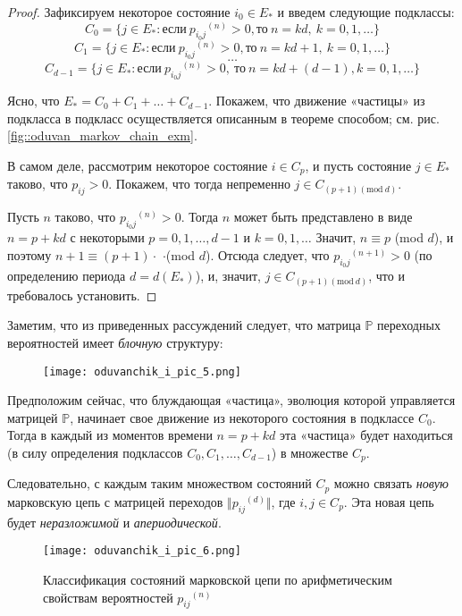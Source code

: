 \begin{proof}
    Зафиксируем некоторое состояние $i_0 \in E_*$ и введем следующие подклассы:
    \[
    C_0 = \{j \in E_* : \text{если}~ {p_{i_0j}}^{(n)} > 0, \text{то}~ n = kd,~ k = 0, 1, \ldots\}
    \]
    \[
    C_1 = \{j \in E_* : если~ {p_{i_0j}}^{(n)} > 0, \text{то}~ n = kd + 1,~ k = 0, 1, \ldots\}
    \]
    \[
    \ldots\]
    \[
    C_{d-1} = \{j \in E_* : \text{если}~ {p_{i_0j}}^{(n)} > 0,~ \text{то}~ n = kd + (d-1), k = 0, 1, \ldots\}
    \]

    Ясно, что $E_* =C_0 + C_1 + \ldots + C_{d-1}$. Покажем, что движение «частицы» из подкласса в подкласс осуществляется описанным в теореме способом; см. рис. \ref{fig::oduvan_markov_chain_exm}.
    
В самом деле, рассмотрим некоторое состояние $i \in C_p$, и пусть состояние $j \in E_*$ таково, что $p_{ij} > 0$. Покажем, что тогда непременно $j \in C_{(p+1) (\text{mod}~ d)}.$

Пусть $n$ таково, что ${p_{i_0j}}^{(n)} > 0$. Тогда $n$ может быть представлено в виде $n = p + kd$ с некоторыми $p = 0, 1, \ldots, d - 1$ и $k = 0, 1, \ldots$ Значит, $n \equiv p$ (mod $d$), и поэтому $n + 1 \equiv (p + 1) \cdot$ $\cdot$(mod $d$). Отсюда следует, что ${p_{i_0j}}^{(n+1)} > 0$ (по определению периода $d = d(E_*)$), и, значит, $j \in C_{(p+1) (\text{mod}~ d)}$, что и
требовалось установить.
\end{proof}

Заметим, что из приведенных рассуждений следует, что матрица $\mathbb{P}$ переходных вероятностей имеет \emph{блочную} структуру:

\begin{figure}[h!]
    \centering
    \texttt{[image: oduvanchik\_i\_pic\_5.png]}
\end{figure}

Предположим сейчас, что блуждающая «частица», эволюция которой
управляется матрицей $\mathbb{P}$, начинает свое движение из некоторого состояния
в подклассе $C_0$. Тогда в каждый из моментов времени $n = p +kd$ эта «частица» будет находиться (в силу определения подклассов $C_0, C_1, \ldots, C_{d-1}$)
в множестве $C_p$.

Следовательно, с каждым таким множеством состояний $C_p$ можно связать \emph{новую} марковскую цепь с матрицей переходов $\Vert {p_{ij}}^{(d)} \Vert$, где $i, j \in C_p$. Эта новая цепь будет \emph{неразложимой} и \emph{апериодической}.

\begin{figure}[h!]
			\centering
			\texttt{[image: oduvanchik\_i\_pic\_6.png]}
			\caption{Классификация состояний марковской цепи по арифметическим свойствам
вероятностей ${p_{ij}}^{(n)}$}
			\label{ris lab}
\end{figure}


